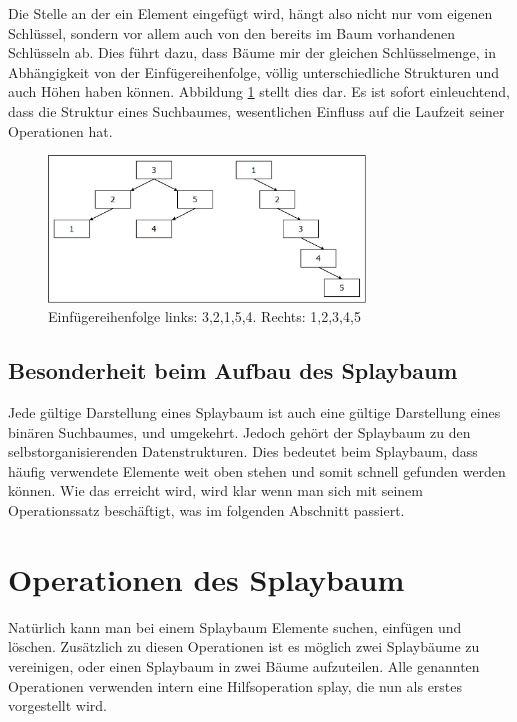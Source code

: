 \documentclass[11pt, a4paper]{article}
\begin{document}
	\noindent  Die Stelle an der ein Element eingefügt wird, hängt also nicht nur vom eigenen Schlüssel, sondern vor allem auch von den bereits im Baum vorhandenen Schlüsseln ab. Dies führt dazu, dass Bäume mir der gleichen Schlüsselmenge, in Abhängigkeit von der Einfügereihenfolge, völlig unterschiedliche Strukturen und auch Höhen haben können.
	Abbildung \ref{fig:SuchbaumEingabefolge} stellt dies dar. Es ist sofort einleuchtend, dass
	die Struktur eines Suchbaumes, wesentlichen Einfluss auf die Laufzeit seiner Operationen
	hat.
	
	 \begin{figure}[h]
		\centering
		\includegraphics[width=0.75\textwidth]{"bilder/SuchbaumEingabefolge"}
		\caption{Einfügereihenfolge links: 3,2,1,5,4. Rechts: 1,2,3,4,5}
		\label{fig:SuchbaumEingabefolge}
	\end{figure}


	\subsection{Besonderheit beim Aufbau des Splaybaum}
	Jede gültige Darstellung eines Splaybaum ist auch eine gültige Darstellung eines binären Suchbaumes, und umgekehrt. Jedoch gehört der Splaybaum zu den selbstorganisierenden Datenstrukturen. Dies bedeutet beim Splaybaum, dass häufig verwendete Elemente weit oben stehen und somit schnell gefunden werden können. Wie das erreicht wird, wird klar wenn man sich mit seinem Operationssatz beschäftigt, was im folgenden Abschnitt passiert. 
	
	\section{Operationen des Splaybaum}
	Natürlich kann man bei einem Splaybaum Elemente suchen, einfügen und löschen.
	Zusätzlich zu diesen Operationen ist es möglich zwei Splaybäume zu vereinigen,
	oder einen Splaybaum in zwei Bäume aufzuteilen. Alle genannten Operationen 
	verwenden intern eine Hilfsoperation splay, die nun als erstes vorgestellt 
	wird.
	
\end{document}
